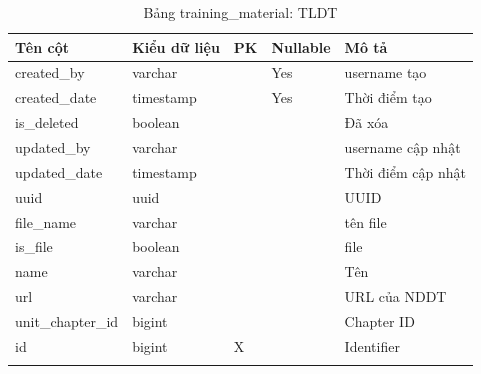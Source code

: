\documentclass[report.tex]{subfiles}
\begin{document}
\begin{table}[!htb]
\begin{longtable}{|p{3cm}|p{3cm}|p{1cm}|p{1.6cm}|p{6cm}|}
\hline
\textbf{Tên cột} & \textbf{Kiểu dữ liệu} & \textbf{PK} & \textbf{Nullable} & \textbf{Mô tả} \\
\hline
created\_by & varchar & & Yes & username tạo \\
created\_date & timestamp & & Yes & Thời điểm tạo \\
is\_deleted & boolean & & & Đã xóa \\
updated\_by & varchar & & & username cập nhật \\
updated\_date & timestamp & & & Thời điểm cập nhật \\
uuid & uuid & & & UUID \\
file\_name & varchar & & & tên file \\
is\_file & boolean & & & file \\
name & varchar & & & Tên \\
url & varchar & & & URL của NDDT \\
unit\_chapter\_id & bigint & & & Chapter ID \\
id & bigint & X & & Identifier \\
\hline
\caption[Bảng training\_material]{Bảng training\_material: TLDT}
\end{longtable}
\end{table}
\FloatBarrier
\end{document}
